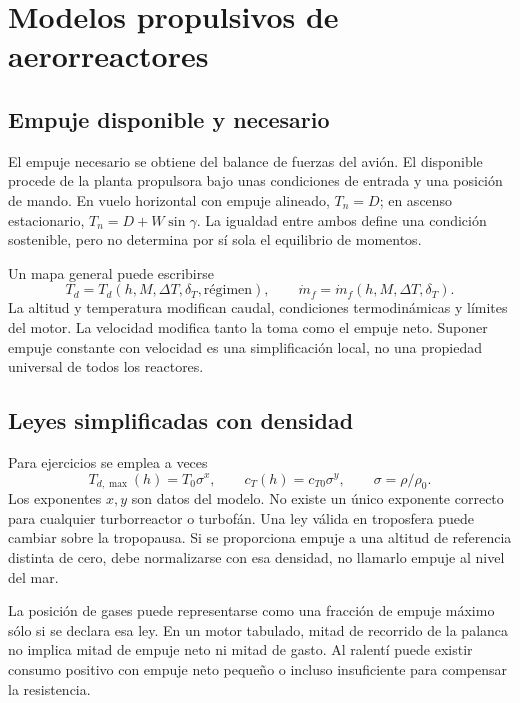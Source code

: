 \chapter{Modelos propulsivos de aerorreactores}\label{ch:jets}

\section{Empuje disponible y necesario}
El empuje necesario se obtiene del balance de fuerzas del avión. El disponible procede de la planta propulsora bajo unas condiciones de entrada y una posición de mando. En vuelo horizontal con empuje alineado, $T_n=D$; en ascenso estacionario, $T_n=D+W\sin\gamma$. La igualdad entre ambos define una condición sostenible, pero no determina por sí sola el equilibrio de momentos.

Un mapa general puede escribirse
\begin{equation}
T_d=T_d(h,M,\Delta T,\delta_T,\text{régimen}),\qquad
\dot m_f=\dot m_f(h,M,\Delta T,\delta_T).
\end{equation}
La altitud y temperatura modifican caudal, condiciones termodinámicas y límites del motor. La velocidad modifica tanto la toma como el empuje neto. Suponer empuje constante con velocidad es una simplificación local, no una propiedad universal de todos los reactores.

\section{Leyes simplificadas con densidad}
Para ejercicios se emplea a veces
\begin{equation}
T_{d,\max}(h)=T_0\sigma^x,\qquad
c_T(h)=c_{T0}\sigma^y,\qquad \sigma=\rho/\rho_0.
\label{eq:lapse}
\end{equation}
Los exponentes $x,y$ son datos del modelo. No existe un único exponente correcto para cualquier turborreactor o turbofán. Una ley válida en troposfera puede cambiar sobre la tropopausa. Si se proporciona empuje a una altitud de referencia distinta de cero, debe normalizarse con esa densidad, no llamarlo empuje al nivel del mar.

La posición de gases puede representarse como una fracción de empuje máximo sólo si se declara esa ley. En un motor tabulado, mitad de recorrido de la palanca no implica mitad de empuje neto ni mitad de gasto. Al ralentí puede existir consumo positivo con empuje neto pequeño o incluso insuficiente para compensar la resistencia.

